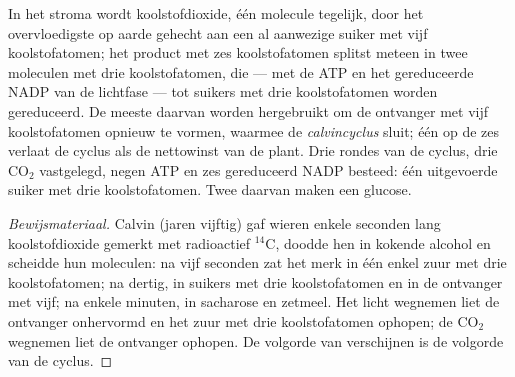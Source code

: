 \begin{proposition}[De calvincyclus]\label{prop:g12:photosynthesis:calvin}
In het stroma wordt koolstofdioxide, één molecule tegelijk, door het
overvloedigste  op aarde gehecht aan een al aanwezige suiker met vijf
koolstofatomen; het product met zes koolstofatomen splitst meteen in twee
moleculen met drie koolstofatomen, die --- met de ATP en het gereduceerde
NADP van de lichtfase --- tot suikers met drie koolstofatomen worden
gereduceerd. De meeste daarvan worden hergebruikt om de ontvanger met vijf
koolstofatomen opnieuw te vormen, waarmee de \emph{calvincyclus}
sluit; één op de zes verlaat de cyclus als de nettowinst van de plant.
Drie rondes van de cyclus, drie $\mathrm{CO_2}$ vastgelegd, negen ATP en
zes gereduceerd NADP besteed: één uitgevoerde suiker met drie
koolstofatomen. Twee daarvan maken een glucose.
\end{proposition}
\begin{proof}[Bewijsmateriaal]
Calvin (jaren vijftig) gaf wieren enkele seconden lang koolstofdioxide
gemerkt met radioactief $^{14}$C, doodde hen in kokende alcohol en
scheidde hun moleculen: na vijf seconden zat het merk in één enkel zuur
met drie koolstofatomen; na dertig, in suikers met drie koolstofatomen en
in de ontvanger met vijf; na enkele minuten, in sacharose en zetmeel. Het
licht wegnemen liet de ontvanger onhervormd en het zuur met drie
koolstofatomen ophopen; de $\mathrm{CO_2}$ wegnemen liet de ontvanger
ophopen. De volgorde van verschijnen is de volgorde van de cyclus.
\end{proof}

